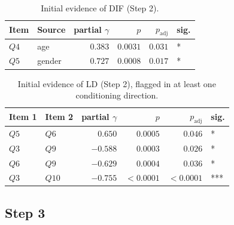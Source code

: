 \documentclass[12pt]{article}
\newcommand{\coauthortodo}[1]{%
  \marginnote{%
    \begin{tcolorbox}[
      width=\marginparwidth,
      colback=yellow!15!white, colframe=orange!70!black,
      colbacktitle=yellow!35!white, coltitle=black,
      title=TODO, fonttitle=\bfseries\scriptsize,
      toptitle=2pt, bottomtitle=2pt,
      fontupper=\scriptsize, boxrule=0.4pt, arc=1mm,
      boxsep=0pt, left=2pt, right=2pt, top=3pt, bottom=3pt,
      before skip=0pt, after skip=0pt
    ]
      \raggedright #1
    \end{tcolorbox}%
  }%
}
\theoremstyle{examplestyle}
\begin{document}

\begin{table}[H]
\centering
\begin{tabular}{@{}llrrrl@{}}
\toprule
Item & Source & partial $\gamma$ & $p$ & $p_{\mathrm{adj}}$ & sig. \\
\midrule
$Q4$ & age & $0.383$ & $0.0031$ & $0.031$ & * \\
$Q5$ & gender & $0.727$ & $0.0008$ & $0.017$ & * \\
\bottomrule
\end{tabular}
\caption{Initial evidence of DIF (Step 2).}
\label{tab:ak_step2_dif}
\end{table}
\begin{table}[H]
\centering
\begin{tabular}{@{}llrrrl@{}}
\toprule
Item 1 & Item 2 & partial $\gamma$ & $p$ & $p_{\mathrm{adj}}$ & sig. \\
\midrule
$Q5$  & $Q6$  & $0.650$  & $0.0005$ & $0.046$ & * \\
$Q3$  & $Q9$  & $-0.588$ & $0.0003$ & $0.026$ & * \\
$Q6$  & $Q9$  & $-0.629$ & $0.0004$ & $0.036$ & * \\
$Q3$  & $Q10$ & $-0.755$ & $<0.0001$ & $<0.0001$ & *** \\
\bottomrule
\end{tabular}
\caption{Initial evidence of LD (Step 2), flagged in at least one conditioning direction.}
\label{tab:ak_step2_ld}
\end{table}

\subsection{Step 3}
\end{document}
